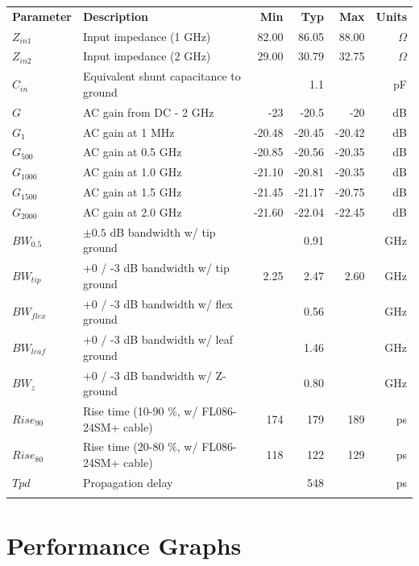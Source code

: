 \documentclass[11pt]{article}
\newcommand{\thinhline}{\Xhline{1\arrayrulewidth}}
\newcommand{\thickhline}{\Xhline{2.5\arrayrulewidth}}
\begin{document}
\begin{tabularx}{16cm}{lXrrrr}
\thickhline
\textbf{Parameter} & \textbf{Description} & \textbf{Min} & \textbf{Typ} & \textbf{Max} & \textbf{Units} \\
\thickhline
$Z_{in1}$ & Input impedance (1 GHz) & 82.00 & 86.05 & 88.00 & $\Omega$ \\
\thinhline
$Z_{in2}$ & Input impedance (2 GHz) & 29.00 & 30.79 & 32.75 & $\Omega$ \\
\thinhline
$C_{in}$ & Equivalent shunt capacitance to ground &  & 1.1 &  & pF \\
\thinhline
$G$ & AC gain from DC - 2 GHz & -23 & -20.5 & -20 & dB \\
\thinhline
$G_1$ & AC gain at 1 MHz & -20.48 & -20.45 & -20.42 & dB \\
\thinhline
$G_{500}$ & AC gain at 0.5 GHz & -20.85 & -20.56 & -20.35 & dB \\
\thinhline
$G_{1000}$ & AC gain at 1.0 GHz & -21.10 & -20.81 & -20.35 & dB \\
\thinhline
$G_{1500}$ & AC gain at 1.5 GHz & -21.45 & -21.17 & -20.75 & dB \\
\thinhline
$G_{2000}$ & AC gain at 2.0 GHz & -21.60 & -22.04 & -22.45 & dB \\
\thinhline
$BW_{0.5}$ & $\pm 0.5$ dB bandwidth w/ tip ground &  & 0.91 & & GHz \\
\thinhline
$BW_{tip}$ & +0 / -3 dB bandwidth w/ tip ground & 2.25 & 2.47 & 2.60 & GHz \\
\thinhline
$BW_{flex}$ & +0 / -3 dB bandwidth w/ flex ground &  & 0.56 &  & GHz \\
\thinhline
$BW_{leaf}$ & +0 / -3 dB bandwidth w/ leaf ground &  & 1.46 &  & GHz \\
\thinhline
$BW_{z}$ & +0 / -3 dB bandwidth w/ Z-ground &  & 0.80 &  & GHz \\
\thinhline
$Rise_{90}$ & Rise time (10-90 \%, w/ FL086-24SM+ cable) & 174 & 179 & 189 & ps \\
\thinhline
$Rise_{80}$ & Rise time (20-80 \%, w/ FL086-24SM+ cable) & 118 & 122 & 129 & ps \\
\thinhline
$Tpd$ & Propagation delay &  & 548 &  & ps \\
\thickhline
\end{tabularx}

\pagebreak
\section{Performance Graphs}
\end{document}
